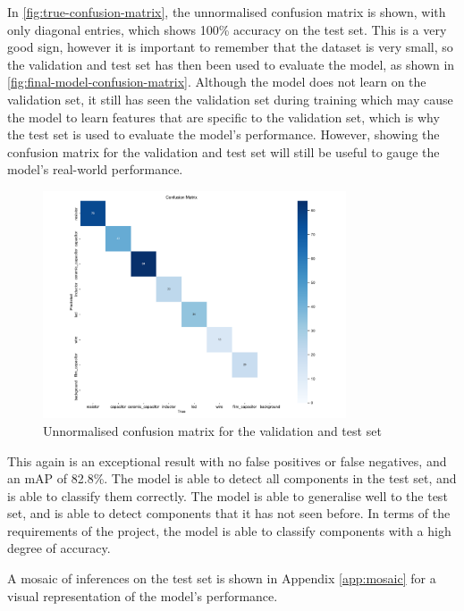 In \autoref{fig:true-confusion-matrix}, the unnormalised confusion matrix is shown, with only diagonal entries, which shows 100\% accuracy on the test set. This is a very good sign, however it is important to remember that the dataset is very small, so the validation and test set has then been used to evaluate the model, as shown in \autoref{fig:final-model-confusion-matrix}. Although the model does not learn on the validation set, it still has seen the validation set during training which may cause the model to learn features that are specific to the validation set, which is why the test set is used to evaluate the model's performance. However, showing the confusion matrix for the validation and test set will still be useful to gauge the model's real-world performance.

\begin{figure}[H]
  \centering
  \includegraphics[width=0.8\textwidth]{imgs/graphs/confusion_matrix_final_valtest.png}
  \caption{Unnormalised confusion matrix for the validation and test set}
  \label{fig:final-model-confusion-matrix}
\end{figure}

This again is an exceptional result with no false positives or false negatives, and an mAP of 82.8\%. The model is able to detect all components in the test set, and is able to classify them correctly. The model is able to generalise well to the test set, and is able to detect components that it has not seen before. In terms of the requirements of the project, the model is able to classify components with a high degree of accuracy.

A mosaic of inferences on the test set is shown in Appendix \autoref{app:mosaic} for a visual representation of the model's performance. 

